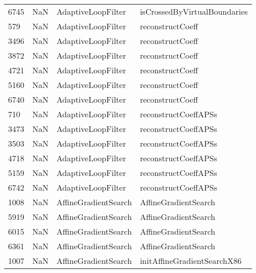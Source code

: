 \begin{tabular}{llll}
6745 &                   NaN &         AdaptiveLoopFilter &              isCrossedByVirtualBoundaries \\
579  &                   NaN &         AdaptiveLoopFilter &                          reconstructCoeff \\
3496 &                   NaN &         AdaptiveLoopFilter &                          reconstructCoeff \\
3872 &                   NaN &         AdaptiveLoopFilter &                          reconstructCoeff \\
4721 &                   NaN &         AdaptiveLoopFilter &                          reconstructCoeff \\
5160 &                   NaN &         AdaptiveLoopFilter &                          reconstructCoeff \\
6740 &                   NaN &         AdaptiveLoopFilter &                          reconstructCoeff \\
710  &                   NaN &         AdaptiveLoopFilter &                      reconstructCoeffAPSs \\
3473 &                   NaN &         AdaptiveLoopFilter &                      reconstructCoeffAPSs \\
3503 &                   NaN &         AdaptiveLoopFilter &                      reconstructCoeffAPSs \\
4718 &                   NaN &         AdaptiveLoopFilter &                      reconstructCoeffAPSs \\
5159 &                   NaN &         AdaptiveLoopFilter &                      reconstructCoeffAPSs \\
6742 &                   NaN &         AdaptiveLoopFilter &                      reconstructCoeffAPSs \\
1008 &                   NaN &       AffineGradientSearch &                      AffineGradientSearch \\
5919 &                   NaN &       AffineGradientSearch &                      AffineGradientSearch \\
6015 &                   NaN &       AffineGradientSearch &                      AffineGradientSearch \\
6361 &                   NaN &       AffineGradientSearch &                      AffineGradientSearch \\
1007 &                   NaN &       AffineGradientSearch &               initAffineGradientSearchX86 \\

\end{tabular}
